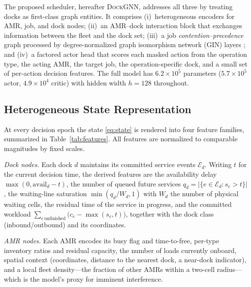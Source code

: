 The proposed scheduler, hereafter \textsc{DockGNN}, addresses all three
by treating docks as first-class graph entities. It comprises
(i)~heterogeneous encoders for AMR, job, and dock nodes;
(ii)~an AMR--dock interaction block that exchanges information between
the fleet and the dock set;
(iii)~a job \emph{contention--precedence} graph processed by
degree-normalized graph isomorphism network (GIN) layers
\cite{xu2019gin}; and
(iv)~a factored actor head that scores each masked action from the
operation type, the acting AMR, the target job, the operation-specific
dock, and a small set of per-action decision features. The full model
has $6.2\times10^{5}$ parameters ($5.7\times10^{5}$ actor,
$4.9\times10^{4}$ critic) with hidden width $h=128$ throughout.


\subsection{Heterogeneous State Representation}
\label{sec:features}

At every decision epoch the state \eqref{eq:state} is rendered into four
feature families, summarized in Table~\ref{tab:features}. All features
are normalized to comparable magnitudes by fixed scales.

\emph{Dock nodes.} Each dock $d$ maintains its committed service events
$\mathcal{E}_d$. Writing $t$ for the current decision time, the derived
features are the availability delay
$\max(0,\mathrm{avail}_d-t)$, the number of queued future services
$q_d=|\{e\in\mathcal{E}_d : s_e>t\}|$, the waiting-line saturation
$\min(q_d/W_d,1)$ with $W_d$ the number of physical waiting cells, the
residual time of the service in progress, and the committed workload
$\sum_{e\,\text{unfinished}}\big(c_e-\max(s_e,t)\big)$, together with
the dock class (inbound/outbound) and its coordinates.

\emph{AMR nodes.} Each AMR encodes its busy flag and time-to-free,
per-type inventory ratios and residual capacity, the number of loads
currently onboard, spatial context (coordinates, distance to the
nearest dock, a near-dock indicator), and a local fleet density---the
fraction of other AMRs within a two-cell radius---which is the model's
proxy for imminent interference.


